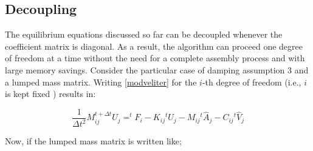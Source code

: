 \documentclass[12pt,letterpaper]{article}
\begin{document}


%
%
%
%


\subsection{Decoupling}
The equilibrium equations discussed so far can be decoupled whenever the coefficient matrix is diagonal. As a result, the algorithm can proceed one degree of freedom at a time without the need for a complete assembly process and with large memory savings. Consider the particular case of damping assumption 3 and a lumped mass matrix. Writing  \cref{modveliter} for the $i$-th degree of freedom (i.e., $i$ is kept fixed ) results in:

\begin{equation}
\dfrac{1}{\Delta t^2}M_{ij} ^{t+ \Delta t}U_j=^{t}F_i-K_{ij} {^{t}U_j}-M_{ij} {^{t}\hat{A}_j}-C_{ij}{^{t}\hat{V}_j}
\label{equildecoupled1}
\end{equation}

Now, if the lumped mass matrix is written like;
\end{document}
